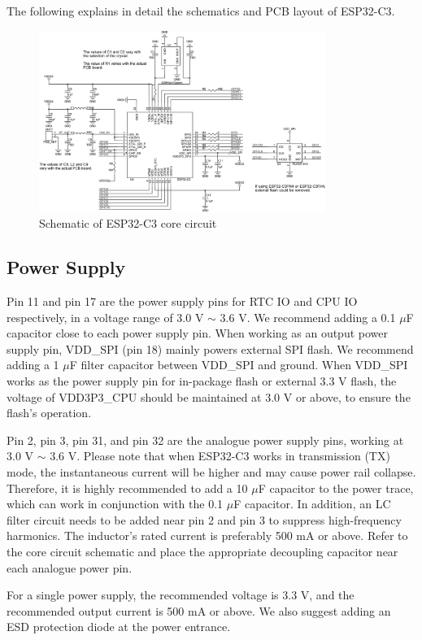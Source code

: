 \documentclass[a4paper,12pt,openany]{book}
\begin{document}
The following explains in detail the schematics and PCB layout of ESP32-C3.

\begin{figure}[h!]
    \centering
    \includegraphics[width=0.83\textwidth]{D5Z/5-6}
    \caption{Schematic of ESP32-C3 core circuit}
\end{figure}

\subsection{Power Supply}
Pin 11 and pin 17 are the power supply pins for RTC IO and CPU IO respectively, in a voltage range of 3.0 V $\sim$ 3.6 V. We recommend adding a 0.1 $\mu$F capacitor close to each power supply pin. When working as an output power supply pin, VDD\_SPI (pin 18) mainly powers external SPI flash. We recommend adding a 1 $\mu$F filter capacitor between VDD\_SPI and ground. When VDD\_SPI works as the power supply pin for in-package flash or external 3.3 V flash, the voltage of VDD3P3\_CPU should be maintained at 3.0 V or above, to ensure the flash’s operation.

Pin 2, pin 3, pin 31, and pin 32 are the analogue power supply pins, working at 3.0 V $\sim$ 3.6 V. Please note that when ESP32-C3 works in transmission (TX) mode, the instantaneous current will be higher and may cause power rail collapse. Therefore, it is highly recommended to add a 10 $\mu$F capacitor to the power trace, which can work in conjunction with the 0.1 $\mu$F capacitor. In addition, an LC filter circuit needs to be added near pin 2 and pin 3 to suppress high-frequency harmonics. The inductor’s rated current is preferably 500 mA or above. Refer to the core circuit schematic and place the appropriate decoupling capacitor near each analogue power pin.

For a single power supply, the recommended voltage is 3.3 V, and the recommended output current is 500 mA or above. We also suggest adding an ESD protection diode at the power entrance.
\end{document}
